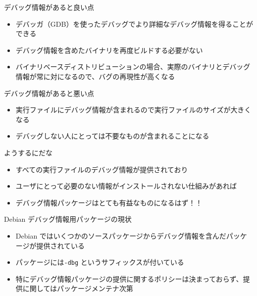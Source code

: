 \begin{frame}{デバッグ情報があると良い点}
\begin{itemize}
\item デバッガ（GDB）を使ったデバッグでより詳細なデバッグ情報を得ることができる
\item デバッグ情報を含めたバイナリを再度ビルドする必要がない
\item バイナリベースディストリビューションの場合、実際のバイナリとデバッグ情報が常に対になるので、バグの再現性が高くなる
\end{itemize}
\end{frame}

\begin{frame}{デバッグ情報があると悪い点}

\begin{itemize}
\item 実行ファイルにデバッグ情報が含まれるので実行ファイルのサイズが大きくなる
\item デバッグしない人にとっては不要なものが含まれることになる
\end{itemize}

\end{frame}

\begin{frame}{ようするにだな}
\begin{itemize}
\item すべての実行ファイルのデバッグ情報が提供されており
\item ユーザにとって必要のない情報がインストールされない仕組みがあれば
\item デバッグ情報パッケージはとても有益なものになるはず！！
\end{itemize}
\end{frame}


\begin{frame}{Debian デバッグ情報用パッケージの現状}
\pause
\begin{itemize}
\item Debian ではいくつかのソースパッケージからデバッグ情報を含んだパッケージが提供されている
\item パッケージには\texttt{-dbg} というサフィックスが付いている
\item 特にデバッグ情報パッケージの提供に関するポリシーは決まっておらず、提供に関してはパッケージメンテナ次第
\end{itemize}
\end{frame}

